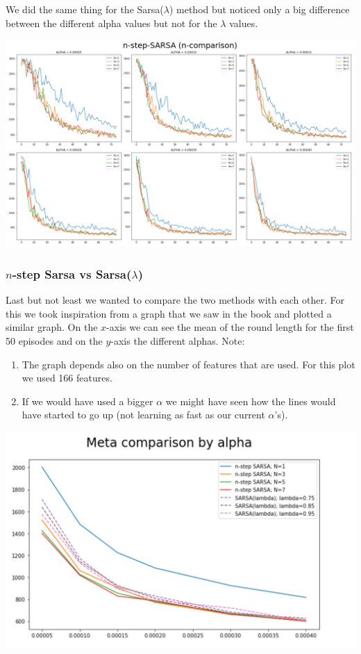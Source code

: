 We did the same thing for the Sarsa($\lambda$) method but noticed only a big difference between the different alpha values but not for the $\lambda$ values.
\begin{center}
\includegraphics[scale=0.22]{graphics/plot08.png}
\end{center}

\subsubsection*{$n$-step Sarsa vs Sarsa($\lambda$)}
Last but not least we wanted to compare the two methods with each other. For this we took inspiration from a graph that we saw in the book \cite{Sutton1998} and plotted a similar graph. On the $x$-axis we can see the mean of the round length for the first 50 episodes and on the $y$-axis the different alphas. Note:
\begin{enumerate}
\item The graph depends also on the number of features that are used. For this plot we used 166 features. 
\item If we would have used a bigger $\alpha$ we might have seen how the lines would have started to go up (not learning as fast as our current $\alpha$'s).
\end{enumerate}
\begin{center}
\includegraphics[scale=0.22]{graphics/plot09.png}
\end{center}


